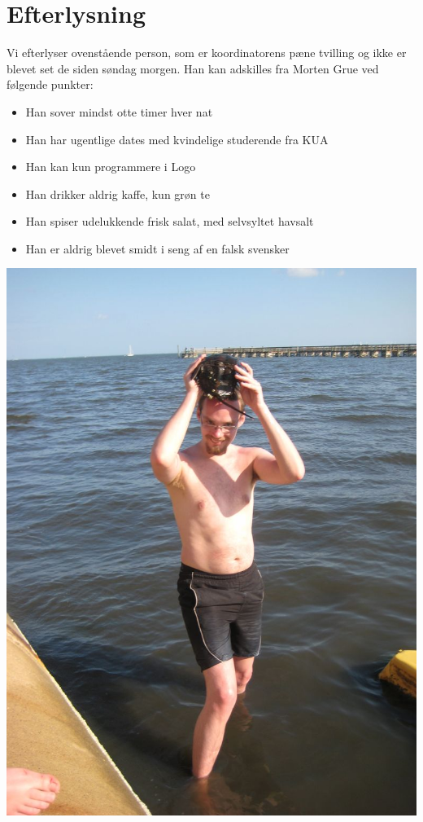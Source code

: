 \begin{minipage}[b]{0.95\linewidth}
\begin{minipage}[t]{0.47\textwidth}
\section*{Efterlysning}

Vi efterlyser ovenstående person, som er koordinatorens pæne tvilling og ikke er blevet set de siden søndag morgen. Han kan adskilles fra Morten Grue ved følgende punkter:
\begin{itemize}
\item Han sover mindst otte timer hver nat
\item Han har ugentlige dates med kvindelige studerende fra KUA
\item Han kan kun programmere i Logo
\item Han drikker aldrig kaffe, kun grøn te
\item Han spiser udelukkende frisk salat, med selvsyltet havsalt
\item Han er aldrig blevet smidt i seng af en falsk svensker
\end{itemize}

\includegraphics[width=\linewidth]{sexygrue.jpg}

\end{minipage}
\end{minipage}
